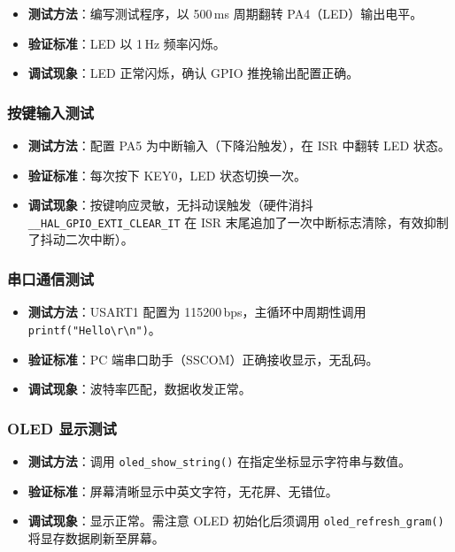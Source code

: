 \documentclass[12pt,a4paper,UTF8]{ctexrep}
\begin{document}
\begin{itemize}
  \item \textbf{测试方法}：编写测试程序，以 500\,ms 周期翻转 PA4（LED）输出电平。
  \item \textbf{验证标准}：LED 以 1\,Hz 频率闪烁。
  \item \textbf{调试现象}：LED 正常闪烁，确认 GPIO 推挽输出配置正确。
\end{itemize}

\subsubsection{按键输入测试}

\begin{itemize}
  \item \textbf{测试方法}：配置 PA5 为中断输入（下降沿触发），在 ISR 中翻转 LED 状态。
  \item \textbf{验证标准}：每次按下 KEY0，LED 状态切换一次。
  \item \textbf{调试现象}：按键响应灵敏，无抖动误触发（硬件消抖 \texttt{\_\_HAL\_GPIO\_EXTI\_CLEAR\_IT} 在 ISR 末尾追加了一次中断标志清除，有效抑制了抖动二次中断）。
\end{itemize}

\subsubsection{串口通信测试}

\begin{itemize}
  \item \textbf{测试方法}：USART1 配置为 115200\,bps，主循环中周期性调用 \verb|printf("Hello\r\n")|。
  \item \textbf{验证标准}：PC 端串口助手（SSCOM）正确接收显示，无乱码。
  \item \textbf{调试现象}：波特率匹配，数据收发正常。
\end{itemize}

\subsubsection{OLED 显示测试}

\begin{itemize}
  \item \textbf{测试方法}：调用 \texttt{oled\_show\_string()} 在指定坐标显示字符串与数值。
  \item \textbf{验证标准}：屏幕清晰显示中英文字符，无花屏、无错位。
  \item \textbf{调试现象}：显示正常。需注意 OLED 初始化后须调用 \texttt{oled\_refresh\_gram()} 将显存数据刷新至屏幕。
\end{itemize}
\end{document}
